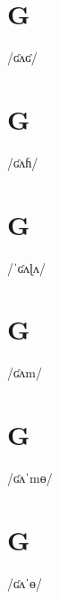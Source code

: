 \documentclass[10pt,a4paper,twoside]{book}
\begin{document}
\section*{G}

\begin{multicols}{3}
 {/ʛʌʛ/} {}
\end{multicols}

\section*{G}

\begin{multicols}{3}
 {/ʛʌɦ/} {}
\end{multicols}

\section*{G}

\begin{multicols}{3}
 {/ˈʛʌɭʌ/} {}
\end{multicols}

\section*{G}

\begin{multicols}{3}
 {/ʛʌm/} {}
\end{multicols}

\section*{G}

\begin{multicols}{3}
 {/ʛʌˈmɵ/} {}
\end{multicols}

\section*{G}

\begin{multicols}{3}
 {/ʛʌˈɵ/} {}
\end{multicols}
\end{document}
